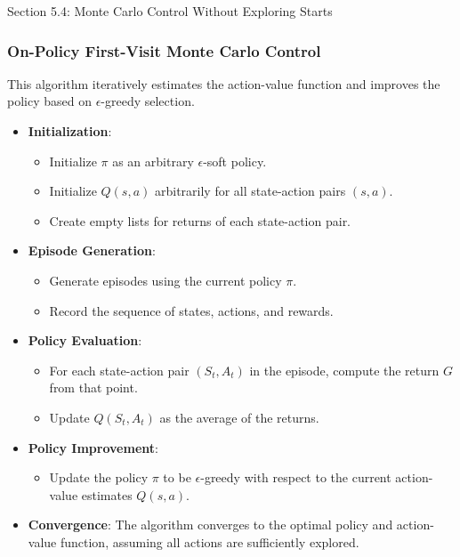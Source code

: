 \begin{notes}{Section 5.4: Monte Carlo Control Without Exploring Starts}
\begin{highlight}
    \end{highlight}
    
    \subsubsection*{On-Policy First-Visit Monte Carlo Control}
    
    This algorithm iteratively estimates the action-value function and improves the policy based on $\epsilon$-greedy selection.
    
    \begin{highlight}
    
        \begin{itemize}
            \item \textbf{Initialization}:
                \begin{itemize}
                    \item Initialize $\pi$ as an arbitrary $\epsilon$-soft policy.
                    \item Initialize $Q(s, a)$ arbitrarily for all state-action pairs $(s, a)$.
                    \item Create empty lists for returns of each state-action pair.
                \end{itemize}
            \item \textbf{Episode Generation}:
                \begin{itemize}
                    \item Generate episodes using the current policy $\pi$.
                    \item Record the sequence of states, actions, and rewards.
                \end{itemize}
            \item \textbf{Policy Evaluation}:
                \begin{itemize}
                    \item For each state-action pair $(S_t, A_t)$ in the episode, compute the return $G$ from that point.
                    \item Update $Q(S_t, A_t)$ as the average of the returns.
                \end{itemize}
            \item \textbf{Policy Improvement}:
                \begin{itemize}
                    \item Update the policy $\pi$ to be $\epsilon$-greedy with respect to the current action-value estimates $Q(s, a)$.
                \end{itemize}
            \item \textbf{Convergence}: The algorithm converges to the optimal policy and action-value function, assuming all actions are sufficiently explored.
        \end{itemize}
    

\end{highlight}
\end{notes}
